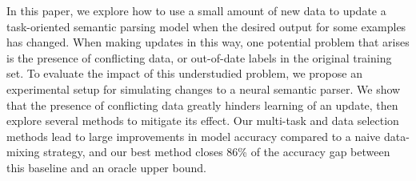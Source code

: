 In this paper, we explore how to use a small amount of new data to update a task-oriented semantic parsing model when the desired output for some examples has changed.  When making updates in this way, one potential problem that arises is the presence of conflicting data, or out-of-date labels in the original training set.  To evaluate the impact of this understudied problem, we propose an experimental setup for simulating changes to a neural semantic parser.  We show that the presence of conflicting data greatly hinders learning of an update, then explore several methods to mitigate its effect.  Our multi-task and data selection methods lead to large improvements in model accuracy compared to a naive data-mixing strategy, and our best method closes 86\% of the accuracy gap between this baseline and an oracle upper bound.
